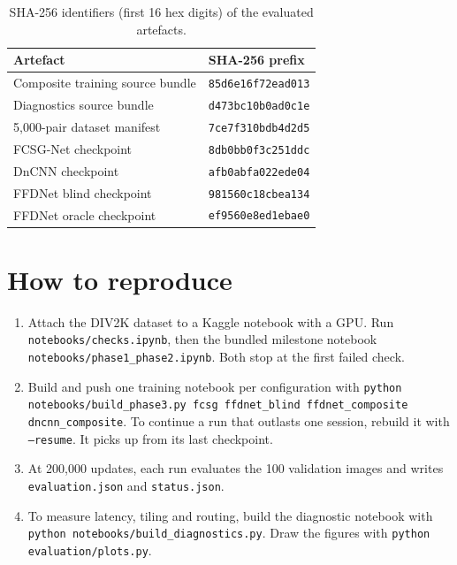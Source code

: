\documentclass[12pt,a4paper,oneside]{NITR}
\newcommand{\fcsg}{FCSG-Net}
\begin{document}
\begin{table}[htbp]
	\centering
	\caption{SHA-256 identifiers (first 16 hex digits) of the evaluated artefacts.}
	\label{tab:hashes}
	\small
	\begin{tabular}{@{}ll@{}}
		\toprule
		Artefact & SHA-256 prefix \\
		\midrule
		Composite training source bundle & \texttt{85d6e16f72ead013} \\
		Diagnostics source bundle        & \texttt{d473bc10b0ad0c1e} \\
		5,000-pair dataset manifest      & \texttt{7ce7f310bdb4d2d5} \\
		\fcsg{} checkpoint               & \texttt{8db0bb0f3c251ddc} \\
		DnCNN checkpoint                 & \texttt{afb0abfa022ede04} \\
		FFDNet blind checkpoint          & \texttt{981560c18cbea134} \\
		FFDNet oracle checkpoint         & \texttt{ef9560e8ed1ebae0} \\
		\bottomrule
	\end{tabular}
\end{table}

\section{How to reproduce}

\begin{enumerate}
	\item Attach the DIV2K dataset to a Kaggle notebook with a GPU. Run
	\texttt{notebooks/checks.ipynb}, then the bundled milestone notebook
	\texttt{notebooks/phase1\_phase2.ipynb}. Both stop at the first failed
	check.
	\item Build and push one training notebook per configuration with
	\texttt{python notebooks/build\_phase3.py fcsg ffdnet\_blind
	ffdnet\_composite dncnn\_composite}. To continue a run that outlasts one
	session, rebuild it with \texttt{--resume}. It picks up from its last
	checkpoint.
	\item At 200,000 updates, each run evaluates the 100 validation images and
	writes \texttt{evaluation.json} and \texttt{status.json}.
	\item To measure latency, tiling and routing, build the diagnostic notebook
	with \texttt{python notebooks/build\_diagnostics.py}. Draw the figures with
	\texttt{python evaluation/plots.py}.
\end{enumerate}
\end{document}
